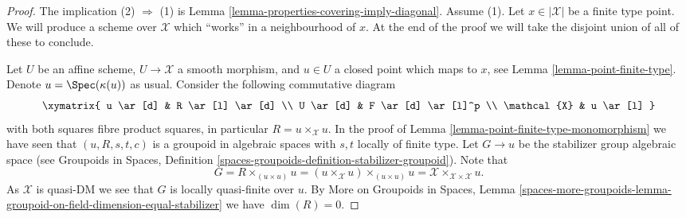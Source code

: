 \begin{proof}
The implication (2) $\Rightarrow$ (1) is
Lemma \ref{lemma-properties-covering-imply-diagonal}.
Assume (1).
Let $x \in |\mathcal{X}|$ be a finite type point. We will produce a scheme
over $\mathcal{X}$ which ``works'' in a neighbourhood of $x$. At the end
of the proof we will take the disjoint union of all of these to conclude.

\medskip\noindent
Let $U$ be an affine scheme, $U \to \mathcal{X}$ a smooth morphism, and
$u \in U$ a closed point which maps to $x$, see
Lemma \ref{lemma-point-finite-type}.
Denote $u = \Spec(\kappa(u))$ as usual. Consider the following
commutative diagram
$$
\xymatrix{
u \ar[d] & R \ar[l] \ar[d] \\
U \ar[d] & F \ar[d] \ar[l]^p \\
\mathcal{X} & u \ar[l]
}
$$
with both squares fibre product squares, in particular
$R = u \times_\mathcal{X} u$. In the proof of
Lemma \ref{lemma-point-finite-type-monomorphism}
we have seen that $(u, R, s, t, c)$ is a groupoid in algebraic spaces
with $s, t$ locally of finite type. Let $G \to u$ be the stabilizer group
algebraic space (see
Groupoids in Spaces, Definition
\ref{spaces-groupoids-definition-stabilizer-groupoid}).
Note that
$$
G = R \times_{(u \times u)} u =
(u \times_\mathcal{X} u) \times_{(u \times u)} u =
\mathcal{X} \times_{\mathcal{X} \times \mathcal{X}} u.
$$
As $\mathcal{X}$ is quasi-DM we see that
$G$ is locally quasi-finite over $u$. By
More on Groupoids in Spaces, Lemma
\ref{spaces-more-groupoids-lemma-groupoid-on-field-dimension-equal-stabilizer}
we have $\dim(R) = 0$.


\end{proof}
